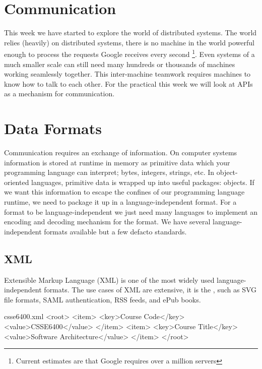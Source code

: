 \documentclass{csse4400}
\begin{document}

\section{Communication}
This week we have started to explore the world of distributed systems.
The world relies (heavily) on distributed systems,
there is no machine in the world powerful enough to process the requests Google receives every second%
\footnote{Current estimates are that Google requires over a million servers}.
Even systems of a much smaller scale can still need many hundreds or thousands of machines working seamlessly together.
This inter-machine teamwork requires machines to know how to talk to each other.
For the practical this week we will look at APIs as a mechanism for communication.

\section{Data Formats}
Communication requires an exchange of information.
On computer systems information is stored at runtime in memory as primitive data which your programming language can interpret;
bytes, integers, strings, etc.
In object-oriented languages,
primitive data is wrapped up into useful packages: objects.
If we want this information to escape the confines of our programming language runtime,
we need to package it up in a language-independent format.
For a format to be language-independent we just need many languages to implement an encoding and decoding mechanism for the format.
We have several language-independent formats available but a few defacto standards.

\subsection{XML}
Extensible Markup Language (XML) is one of the most widely used language-independent formats.
The use cases of XML are extensive,
it is the ,
such as SVG file formats, SAML authentication, RSS feeds, and ePub books.

\begin{code}[language=xml]{csse6400.xml}
<root>
  <item>
    <key>Course Code</key>
    <value>CSSE6400</value>
  </item>
  <item>
    <key>Course Title</key>
    <value>Software Architecture</value>
  </item>
</root>
\end{code}
\end{document}
